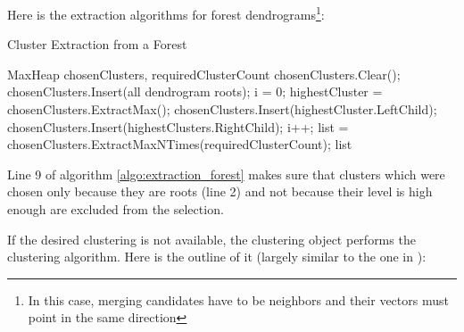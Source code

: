Here is the extraction algorithms for forest dendrograms\footnote{In this case, merging candidates have to be neighbors and their vectors must point in the same direction}:

\begin{algorithm}[H]
\caption{Cluster Extraction from a Forest}
\label{algo:extraction_forest}
\begin{algorithmic}[1]

\Require MaxHeap chosenClusters, requiredClusterCount
\Statex
\State chosenClusters.Clear();
\State chosenClusters.Insert(all dendrogram roots);
\State i = 0;
	\State highestCluster = chosenClusters.ExtractMax();
    \State chosenClusters.Insert(highestCluster.LeftChild);
    \State chosenClusters.Insert(highestClusters.RightChild);
    \State i++;
\EndWhile
\State list = chosenClusters.ExtractMaxNTimes(requiredClusterCount);
\Statex
\Return list
\end{algorithmic}
\end{algorithm}

Line 9 of algorithm \ref{algo:extraction_forest} makes sure that clusters which were chosen only because they are roots (line 2) and not because their level is high enough are excluded from the selection.

If the desired clustering is not available, the clustering object performs the clustering algorithm. Here is the outline of it (largely similar to the one in \citet{Telea99}):

